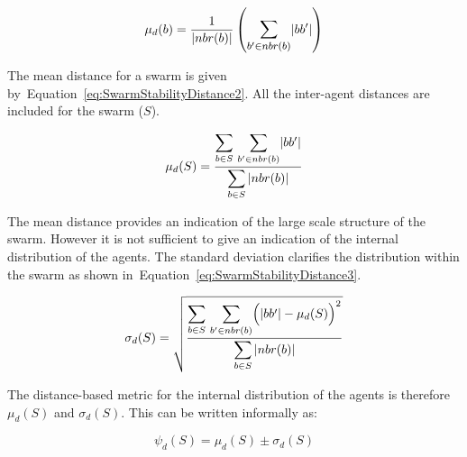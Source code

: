 \documentclass{ieeeaccess}
\begin{document}
\begin{equation}
\label{eq:SwarmStabilityDistance1}
\mu_d(b) = \frac{1}{\mathlarger{|nbr(b)|}}\left({\mathlarger{\sum_{b' \in nbr(b)}}|bb'|}\right)
\end{equation}

The mean distance for a swarm is given 
by~Equation~\ref{eq:SwarmStabilityDistance2}. All the inter-agent distances are
included for the swarm ($S$). 


\begin{equation}
\label{eq:SwarmStabilityDistance2}
\mu_d(S) = \frac{\mathlarger{\sum_{b \in S}}~\mathlarger{\sum_{b' \in nbr(b)}}|bb'|}{\mathlarger{\sum_{b \in S}|nbr(b)|}}
\end{equation}

The mean distance provides an indication of the large scale structure of the
swarm. However it is not sufficient to give an indication of the internal
distribution of the agents. The standard deviation clarifies the distribution
within the swarm as shown in~Equation~\ref{eq:SwarmStabilityDistance3}. 


\begin{equation}
\label{eq:SwarmStabilityDistance3}
\sigma_d(S) = \sqrt{\frac{\mathlarger{\sum_{b \in S}}~\mathlarger{\sum_{b' \in nbr(b)}}\Big(|bb'| - \mu_d(S)\Big)^2}{\mathlarger{\sum_{b \in S}|nbr(b)|}}}
\end{equation}

The distance-based metric for the internal distribution of the agents is
therefore $\mu_d(S)$ and $\sigma_d(S)$. This can be written informally as:

\begin{equation}
\label{eq:SwarmDistanceMetric}
\psi_d(S) = \mu_d(S)\pm \sigma_d(S)
\end{equation}
\end{document}
